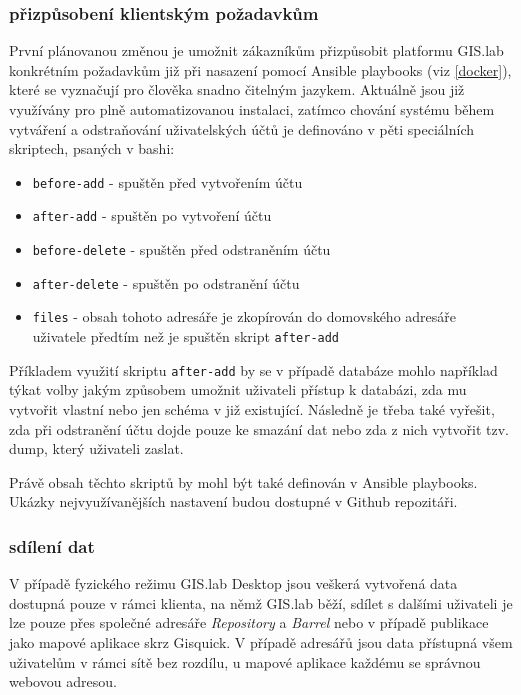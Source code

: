 \subsubsection{přizpůsobení klientským požadavkům}
První plánovanou změnou je umožnit zákazníkům přizpůsobit platformu
GIS.lab konkrétním požadavkům již při nasazení pomocí Ansible
playbooks (viz \ref{docker}), které se vyznačují pro člověka snadno
čitelným jazykem. Aktuálně jsou již využívány pro plně automatizovanou
instalaci, zatímco chování systému během vytváření a odstraňování
uživatelských účtů je definováno v pěti speciálních skriptech, psaných
v bashi:
\begin{itemize}
\item \texttt{before-add} - spuštěn před vytvořením účtu
\item \texttt{after-add} - spuštěn po vytvoření účtu
\item \texttt{before-delete} - spuštěn před odstraněním účtu
\item \texttt{after-delete} - spuštěn po odstranění účtu
\item \texttt{files} - obsah tohoto adresáře je zkopírován do domovského adresáře uživatele předtím než je spuštěn skript \texttt{after-add}
\end{itemize}
Příkladem využití skriptu \texttt{after-add} by se v případě databáze
mohlo například týkat volby jakým způsobem umožnit uživateli přístup k
databázi, zda mu vytvořit vlastní nebo jen schéma v již
existující. Následně je třeba také vyřešit, zda při odstranění účtu
dojde pouze ke smazání dat nebo zda z nich vytvořit tzv. dump, který
uživateli zaslat.

Právě obsah těchto skriptů by mohl být také definován v Ansible
playbooks. Ukázky nejvyužívanějších nastavení budou dostupné v Github
repozitáři.

\subsubsection{sdílení dat}

V případě fyzického režimu GIS.lab Desktop jsou veškerá vytvořená data
dostupná pouze v rámci klienta, na němž GIS.lab běží, sdílet s dalšími
uživateli je lze pouze přes společné adresáře \textit{Repository} a
\textit{Barrel} nebo v případě publikace jako mapové aplikace skrz
Gisquick. V případě adresářů jsou data přístupná všem uživatelům v
rámci sítě bez rozdílu, u mapové aplikace každému se správnou webovou
adresou.

